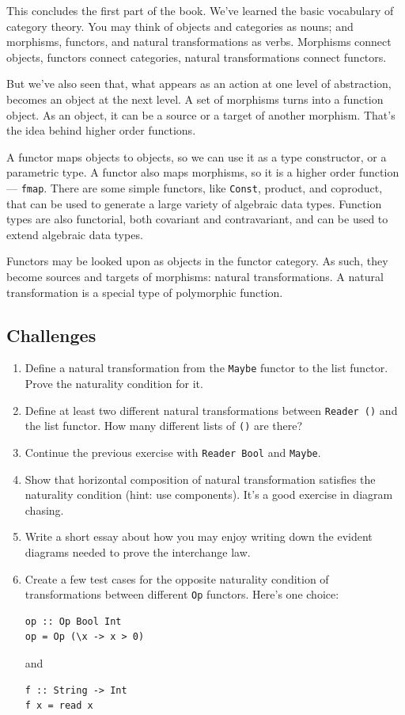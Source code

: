 This concludes the first part of the book. We've learned the basic
vocabulary of category theory. You may think of objects and categories
as nouns; and morphisms, functors, and natural transformations as verbs.
Morphisms connect objects, functors connect categories, natural
transformations connect functors.

But we've also seen that, what appears as an action at one level of
abstraction, becomes an object at the next level. A set of morphisms
turns into a function object. As an object, it can be a source or a
target of another morphism. That's the idea behind higher order
functions.

A functor maps objects to objects, so we can use it as a type
constructor, or a parametric type. A functor also maps morphisms, so it
is a higher order function --- \texttt{fmap}. There are some simple
functors, like \texttt{Const}, product, and coproduct, that can be used
to generate a large variety of algebraic data types. Function types are
also functorial, both covariant and contravariant, and can be used to
extend algebraic data types.

Functors may be looked upon as objects in the functor category. As such,
they become sources and targets of morphisms: natural transformations. A
natural transformation is a special type of polymorphic function.

\subsection{Challenges}\label{challenges}

\begin{enumerate}
\item
  Define a natural transformation from the \texttt{Maybe} functor to the
  list functor. Prove the naturality condition for it.
\item
  Define at least two different natural transformations between
  \texttt{Reader\ ()} and the list functor. How many different lists of
  \texttt{()} are there?
\item
  Continue the previous exercise with \texttt{Reader\ Bool} and
  \texttt{Maybe}.
\item
  Show that horizontal composition of natural transformation satisfies
  the naturality condition (hint: use components). It's a good exercise
  in diagram chasing.
\item
  Write a short essay about how you may enjoy writing down the evident
  diagrams needed to prove the interchange law.
\item
  Create a few test cases for the opposite naturality condition of
  transformations between different \texttt{Op} functors. Here's one
  choice:

\begin{verbatim}
op :: Op Bool Int
op = Op (\x -> x > 0)
\end{verbatim}

  and

\begin{verbatim}
f :: String -> Int
f x = read x
\end{verbatim}
\end{enumerate}

